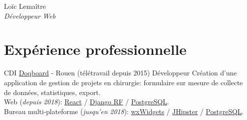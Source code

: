\documentclass[10pt]{article} %
\begin{document}
\begin{paracol}{2} %


  \parbox[top][0.12\textheight][c]{\linewidth}{ %
    \vspace{-0.04\textheight} %
    \centering %
    {\sffamily\Huge Loïc Lemaître}\\\medskip %
    {\Large\color{headings}\textit{Développeur Web}}
  }


  \section{Expérience professionnelle}





  {CDI} %
  {\href{https://doqboard.com}{Doqboard} {\small- Rouen (télétravail depuis 2015)}} %
  {Développeur} %
  {Création d'une application de gestion de projets en chirurgie: formulaire sur mesure de collecte de données, statistiques, export. \\
    Web {\small(\textit{depuis 2018})}: \href{https://reactjs.org/}{React} / \href{https://www.django-rest-framework.org/}{Django RF} / \href{https://www.postgresql.org/}{PostgreSQL}. \\
    Bureau multi-plateforme {\small(\textit{jusqu'en 2018})}: \href{https://www.wxwidgets.org/}{wxWidgets} / \href{https://www.jhipster.tech/}{JHipster} / \href{https://www.postgresql.org/}{PostgreSQL}.} %


\end{paracol}
\end{document}
